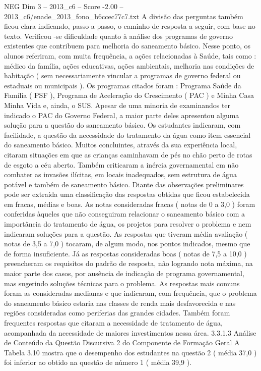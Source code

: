 \begin{textsample}{NEG Dim 3 – 2013\_c6 – Score -2.00 – 2013\_c6/enade\_2013\_fono\_b6ccec77c7.txt}
A divisão das perguntas também ficou clara indicando, passo a passo, o caminho de resposta a seguir, com base no texto.
Verificou -se dificuldade quanto à análise dos programas de governo existentes que contribuem para melhoria do saneamento básico.
Nesse ponto, os alunos referiram, com muita frequência, a ações relacionadas à Saúde, tais como : médico da família, ações educativas, ações ambientais, melhoria nas condições de habitação ( sem necessariamente vincular a programas de governo federal ou estaduais ou municipais ).
Os programas citados foram : Programa Saúde da Família ( PSF ), Programa de Aceleração do Crescimento ( PAC ) e Minha Casa Minha Vida e, ainda, o SUS.
Apesar de uma minoria de examinandos ter indicado o PAC do Governo Federal, a maior parte deles apresentou alguma solução para a questão do saneamento básico.
Os estudantes indicaram, com facilidade, a questão da necessidade do tratamento da água como item essencial do saneamento básico.
Muitos concluintes, através da sua experiência local, citaram situações em que as crianças caminhavam de pés no chão perto de rotas de esgoto a céu aberto.
Também criticaram a inércia governamental em não combater as invasões ilícitas, em locais inadequados, sem estrutura de água potável e também de saneamento básico.
Diante das observações preliminares pode ser extraída uma classificação das respostas obtidas que ficou estabelecida em fracas, médias e boas.
As notas consideradas fracas ( notas de 0 a 3,0 ) foram conferidas àqueles que não conseguiram relacionar o saneamento básico com a importância do tratamento de água, os projetos para resolver o problema e nem indicaram soluções para a questão.
As respostas que tiveram média avaliação ( notas de 3,5 a 7,0 ) tocaram, de algum modo, nos pontos indicados, mesmo que de forma insuficiente.
Já as respostas consideradas boas ( notas de 7,5 a 10,0 ) preencheram os requisitos do padrão de resposta, não logrando nota máxima, na maior parte dos casos, por ausência de indicação de programa governamental, mas sugerindo soluções técnicas para o problema.
As respostas mais comuns foram as consideradas medianas e que indicaram, com frequência, que o problema do saneamento básico estaria nas classes de renda mais desfavorecida e nas regiões consideradas como periferias das grandes cidades.
Também foram frequentes respostas que citaram a necessidade de tratamento de água, acompanhada da necessidade de maiores investimentos nessa área. 3.3.1.3 Análise de Conteúdo da Questão Discursiva 2 do Componente de Formação Geral A Tabela 3.10 mostra que o desempenho dos estudantes na questão 2 ( média 37,0 ) foi inferior ao obtido na questão de número 1 ( média 39,9 ).

\end{textsample}
